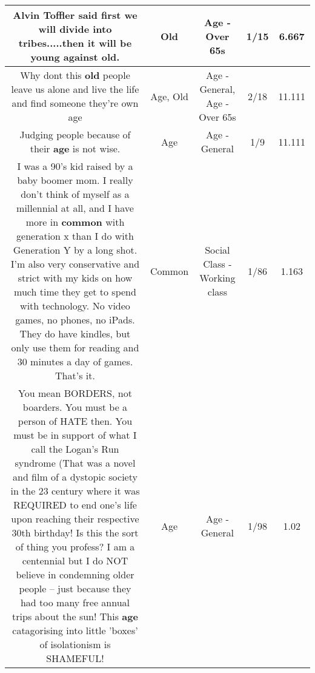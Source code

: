 \documentclass[11pt]{article}
\newlength\mylength
\begin{document}
\begin{center}
\begin{longtable}{|C{.65\mylength}|C{.30\mylength}|C{.12\mylength}|C{.12\mylength}|C{.12\mylength}|}
  \small Alvin Toffler  said first we will divide into tribes.....then it will be young against \textbf{old}.\normalsize   & Old & Age - Over 65s & 1/15 & 6.667 \\  \hline
  \small Why dont this \textbf{old} people leave us alone and live the life and find someone they're own age\normalsize   & Age, Old & Age - General, Age - Over 65s & 2/18 & 11.111 \\  \hline
  \small Judging people because of their \textbf{age} is not wise.\normalsize   & Age & Age - General & 1/9 & 11.111 \\  \hline
  \small I was a 90's kid raised by a baby boomer mom. I really don't think of myself as a millennial at all, and I have more in \textbf{common} with generation x than I do with Generation Y by a long shot. I'm also very conservative and strict with my kids on how much time they get to spend with technology. No video games, no phones, no iPads. They do have kindles, but only use them for reading and 30 minutes a day of games. That's it.\normalsize   & Common & Social Class - Working class & 1/86 & 1.163 \\  \hline
  \small You mean BORDERS, not boarders. You must be a person of HATE then. You must be in support of what I call the Logan's Run syndrome (That was a novel and film of a dystopic society in the 23 century where it was REQUIRED to end one's life upon reaching their respective 30th birthday! Is this the sort of thing you profess? I am a centennial but I do NOT believe in condemning older people -- just because they had too many free annual trips about the sun! This \textbf{age} catagorising into little 'boxes' of isolationism is SHAMEFUL!\normalsize   & Age & Age - General & 1/98 & 1.02 \\  \hline

\end{longtable}
\end{center}
\end{document}
